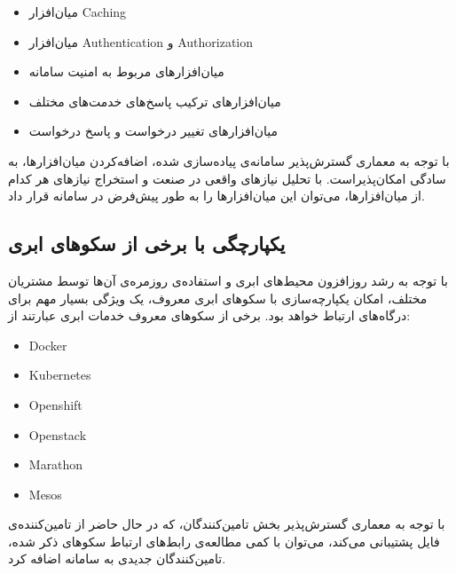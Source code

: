 \begin{itemize}
    \item میان‌افزار Caching
    \item میان‌افزار Authentication و Authorization
    \item میان‌افزار‌های مربوط به امنیت سامانه
    \item میان‌افزار‌های ترکیب پاسخ‌های خدمت‌های مختلف
    \item میان‌افزار‌های تغییر درخواست و پاسخ درخواست
\end{itemize}

با توجه به معماری گسترش‌پذیر سامانه‌ی پیاده‌سازی شده، اضافه‌کردن میان‌افزار‌ها، به سادگی امکان‌پذیراست. با تحلیل نیاز‌های واقعی در صنعت و استخراج نیاز‌های هر کدام از میان‌افزار‌ها،‌ می‌توان این میان‌افزار‌ها را به طور پیش‌فرض در سامانه قرار داد.

\subsection{یکپارچگی با برخی از سکو‌های ابری}\label{subsec:recom_platforms}
با توجه به رشد روز‌افزون محیط‌های ابری و استفاده‌ی روزمره‌ی آن‌ها توسط مشتریان مختلف، امکان یکپارچه‌سازی با سکو‌های ابری معروف، یک ویژگی بسیار مهم برای درگاه‌های ارتباط خواهد بود. برخی از سکو‌های معروف خدمات ابری عبارتند از:

\begin{latin}
    \begin{itemize}
        \item Docker
        \item Kubernetes
        \item Openshift
        \item Openstack
        \item Marathon
        \item Mesos
    \end{itemize}
\end{latin}

با توجه به معماری گسترش‌پذیر بخش تامین‌کنندگان، که در حال حاضر از تامین‌کننده‌ی فایل پشتیبانی می‌کند، می‌توان با کمی مطالعه‌ی رابط‌های ارتباط سکو‌های ذکر شده، تامین‌کنندگان جدیدی به سامانه اضافه کرد.


\cleardoublepage 